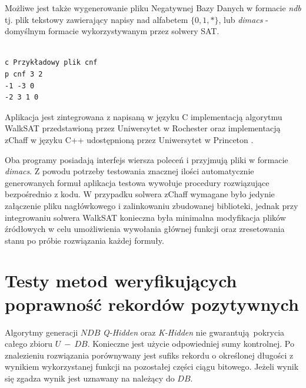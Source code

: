 Możliwe jest także wygenerowanie pliku Negatywnej Bazy Danych w formacie \textit{ndb} tj. plik tekstowy zawierający napisy
nad alfabetem $\{0,1,*\}$, lub \textit{dimacs} - domyślnym formacie wykorzystywanym przez solwery SAT.
\begin{lstlisting}[caption={Przykładowy plik formatu \textit{dimacs}\\Zawartość składa się z komentarzy (linie zaczynające się znakiem \enquote{c}), definicji problemu (linia zaczynająca się znakiem \enquote{p})
i klauzul logicznych.\\ W tym przypadku opisywany jest problem CNF o trzech zmiennych i dwóch klauzulach reprezentujący formułę $(\neg x_1 \lor \neg x_3) \land (\neg x_2 \lor x_3 \lor x_1) $.},captionpos=b]

c Przykładowy plik cnf
p cnf 3 2
-1 -3 0
-2 3 1 0 
\end{lstlisting}

Aplikacja jest zintegrowana z napisaną w języku C implementacją algorytmu WalkSAT przedstawioną przez Uniwersytet w Rochester \cite{walksat-implementation}
oraz implementacją zChaff w języku C++ udostępnioną przez Uniwersytet w Princeton \cite{zchaff-implementation}.

Oba programy posiadają interfejs wiersza poleceń i przyjmują pliki w formacie \textit{dimacs}. Z powodu potrzeby testowania
znacznej ilości automatycznie generowanych formuł aplikacja testowa wywołuje procedury rozwiązujące bezpośrednio z kodu.
W przypadku solwera zChaff wymagane było jedynie załączenie pliku nagłówkowego i zalinkowaniu zbudowanej biblioteki, jednak przy integrowaniu
solwera WalkSAT konieczna była minimalna modyfikacja plików źródłowych w celu umożliwienia wywołania głównej funkcji oraz zresetowania
stanu po próbie rozwiązania każdej formuły.

\section{Testy metod weryfikujących poprawność rekordów pozytywnych}

\label{sec:red-str-test}
Algorytmy generacji $NDB$ \textit{Q-Hidden} oraz \textit{K-Hidden} nie gwarantują pokrycia całego zbioru $U~-~DB$.
Konieczne jest użycie odpowiedniej sumy kontrolnej. Po znalezieniu rozwiązania porównywany jest sufiks rekordu o określonej
długości z wynikiem wykorzystanej funkcji na pozostałej części ciągu bitowego. Jeżeli wynik się zgadza wynik jest uznawany na należący
do $DB$.


